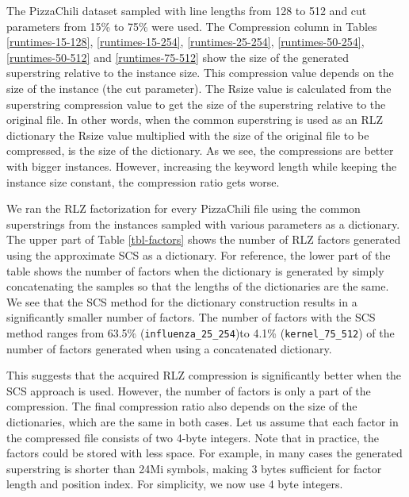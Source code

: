 \documentclass[english,twoside,censored,csm,algorithms-track-2020]{HYthesisML}
\theoremstyle{plain}
\theoremstyle{definition}
\numberwithin{testexample}{chapter}
\begin{document}
The PizzaChili dataset sampled with line lengths from 128 to 512 and cut parameters from 15\% to
75\% were used. The Compression column in Tables \ref{runtimes-15-128}, \ref{runtimes-15-254},
\ref{runtimes-25-254}, \ref{runtimes-50-254}, \ref{runtimes-50-512} and \ref{runtimes-75-512} show the
size of the generated superstring relative to the instance size. This compression value depends
on the size of the instance (the cut parameter). The Rsize value is calculated from the superstring
compression value to get the size of the superstring relative to the original file. In other words,
when the common superstring is used as an RLZ dictionary the Rsize value
multiplied with the size of the original file to be compressed, is the size of the dictionary.
As we see, the compressions are better with bigger instances. However, increasing the keyword length
while keeping the instance size constant, the compression ratio gets worse. 

We ran the RLZ factorization for every PizzaChili file using the common superstrings from the instances
sampled with various parameters as a dictionary. The upper part of Table \ref{tbl-factors} shows the
number of RLZ factors generated using the approximate SCS as a dictionary.
For reference, the lower part of the table shows the number of factors when the dictionary
is generated by simply concatenating the samples so that the lengths of the dictionaries are the same. We see
that the SCS method for the dictionary construction results in a significantly smaller number of factors.
The number of factors with the SCS method ranges from 63.5\% (\texttt{influenza\_25\_254})to 4.1\%
(\texttt{kernel\_75\_512}) of the number of factors generated when using a concatenated dictionary.

This suggests that the acquired RLZ compression is significantly better when the SCS approach is
used. However, the number of factors is only a part of the compression. The final compression ratio
also depends on the size of the dictionaries, which are the same in both cases. Let us assume that each
factor in the compressed file consists of two 4-byte integers. Note that in practice, the factors
could be stored with less space. For example, in many cases the generated superstring is shorter than
24Mi symbols, making 3 bytes sufficient for factor length and position index.
For simplicity, we now use 4 byte integers.
\end{document}
